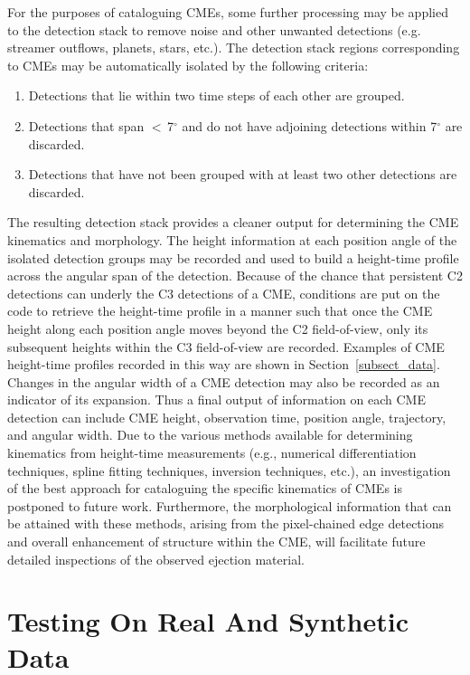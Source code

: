 \documentclass[preprint2]{aastex}
\begin{document}
For the purposes of cataloguing CMEs, some further processing may be applied to the detection stack to remove noise and other unwanted detections (e.g. streamer outflows, planets, stars, etc.). The detection stack regions corresponding to CMEs may be automatically isolated by the following criteria:
\begin{enumerate}
\item Detections that lie within two time steps of each other are grouped.
\item Detections that span $<$\,7$^{\circ}$ and do not have adjoining detections within 7$^{\circ}$ are discarded.
\item Detections that have not been grouped with at least two other detections are discarded.
\end{enumerate}
The resulting detection stack provides a cleaner output for determining the CME kinematics and morphology. The height information at each position angle of the isolated detection groups may be recorded and used to build a height-time profile across the angular span of the detection. Because of the chance that persistent C2 detections can underly the C3 detections of a CME, conditions are put on the code to retrieve the height-time profile in a manner such that once the CME height along each position angle moves beyond the C2 field-of-view, only its subsequent heights within the C3 field-of-view are recorded. Examples of CME height-time profiles recorded in this way are shown in Section~\ref{subsect_data}. Changes in the angular width of a CME detection may also be recorded as an indicator of its expansion. Thus a final output of information on each CME detection can include CME height, observation time, position angle, trajectory, and angular width. Due to the various methods available for determining kinematics from height-time measurements (e.g., numerical differentiation techniques, spline fitting techniques, inversion techniques, etc.), an investigation of the best approach for cataloguing the specific kinematics of CMEs is postponed to future work. Furthermore, the morphological information that can be attained with these methods, arising from the pixel-chained edge detections and overall enhancement of structure within the CME, will facilitate future detailed inspections of the observed ejection material.


\section{Testing On Real And Synthetic Data}
\label{sect_data}
\end{document}
